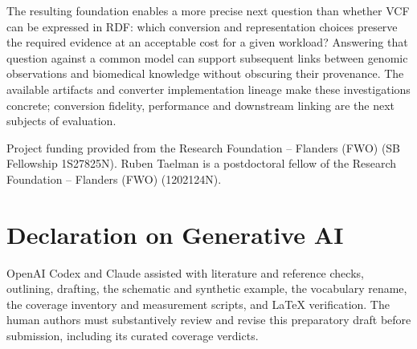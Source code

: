 \documentclass{ceurart}
\begin{document}
The resulting foundation enables a more precise next question than whether VCF can be expressed in RDF: which conversion and representation choices preserve the required evidence at an acceptable cost for a given workload? Answering that question against a common model can support subsequent links between genomic observations and biomedical knowledge without obscuring their provenance. The available artifacts and converter implementation lineage make these investigations concrete; conversion fidelity, performance and downstream linking are the next subjects of evaluation.

\begin{acknowledgments}
Project funding provided from the Research Foundation -- Flanders (FWO) (SB Fellowship 1S27825N).
Ruben Taelman is a postdoctoral fellow of the Research Foundation -- Flanders (FWO) (1202124N).
\end{acknowledgments}

\section*{Declaration on Generative AI}
OpenAI Codex and Claude assisted with literature and reference checks, outlining, drafting, the schematic and synthetic example, the vocabulary rename, the coverage inventory and measurement scripts, and LaTeX verification. The human authors must substantively review and revise this preparatory draft before submission, including its curated coverage verdicts.


\clearpage

\end{document}
